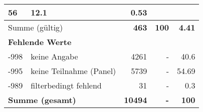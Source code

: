 \begin{longtable}{lXrrr}
       \num{56} &
       \num[round-mode=places,round-precision=2]{12,1} &
         \num[round-mode=places,round-precision=2]{0,53} \\
     \midrule
     \multicolumn{2}{l}{Summe (gültig)} &
       \textbf{\num{463}} &
     \textbf{100} &
       \textbf{\num[round-mode=places,round-precision=2]{4,41}} \\
     \multicolumn{5}{l}{\textbf{Fehlende Werte}}\\
       -998 &
       keine Angabe &
         \num{4261} &
        - &
         \num[round-mode=places,round-precision=2]{40,6} \\
       -995 &
       keine Teilnahme (Panel) &
         \num{5739} &
        - &
         \num[round-mode=places,round-precision=2]{54,69} \\
       -989 &
       filterbedingt fehlend &
         \num{31} &
        - &
         \num[round-mode=places,round-precision=2]{0,3} \\
     \midrule
     \multicolumn{2}{l}{\textbf{Summe (gesamt)}} &
          \textbf{\num{10494}} &
        \textbf{-} &
        \textbf{100} \\
     \bottomrule
     \end{longtable}
     
